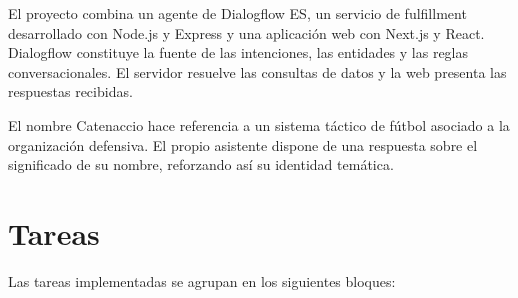 \documentclass[11pt,a4paper]{article}
\begin{document}
El proyecto combina un agente de Dialogflow ES, un servicio de fulfillment desarrollado con Node.js y Express y una aplicación web con Next.js y React. Dialogflow constituye la fuente de las intenciones, las entidades y las reglas conversacionales. El servidor resuelve las consultas de datos y la web presenta las respuestas recibidas.

El nombre Catenaccio hace referencia a un sistema táctico de fútbol asociado a la organización defensiva. El propio asistente dispone de una respuesta sobre el significado de su nombre, reforzando así su identidad temática.

\section{Tareas}

Las tareas implementadas se agrupan en los siguientes bloques:
\end{document}
